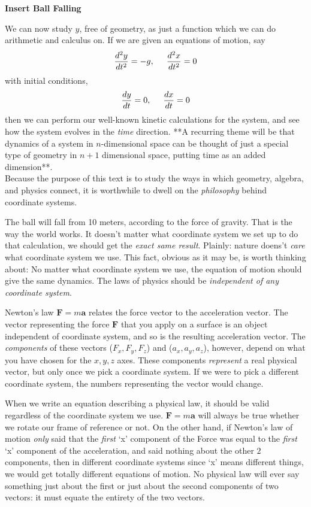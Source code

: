 	\textbf{Insert Ball Falling}
	
	We can now study $y$, free of geometry, as just a function which we can do arithmetic and calculus on. If we are given an equations of motion, say 
	\begin{equation*}
		\frac{d^2y}{dt^2} = -g, \hspace{5mm} \frac{d^2x}{dt^2} = 0
	\end{equation*} 
	with initial conditions,
	\begin{equation*}
		\frac{dy}{dt}=0, \hspace{5mm} \frac{dx}{dt}=0
	\end{equation*}
	 then we can perform our well-known kinetic calculations for the system, and see how the system evolves in the \emph{time} direction. **A recurring theme will be that dynamics of a system in $n$-dimensional space can be thought of just a special type of geometry in $n+1$ dimensional space, putting time as an added dimension**.\\
	
	Because the purpose of this text is to study the ways in which geometry, algebra, and physics connect, it is worthwhile to dwell on the \emph{philosophy} behind coordinate systems.
	
	The ball will fall from 10 meters, according to the force of gravity. That is the way the world works. It doesn't matter what coordinate system we set up to do that calculation, we should get the \emph{exact same result}. Plainly: nature doens't \emph{care} what coordinate system we use. This fact, obvious as it may be, is worth thinking about: No matter what coordinate system we use, the equation of motion should give the same dynamics. The laws of physics should be \emph{independent of any coordinate system}.
	
	Newton's law $\mathbf F = m \mathbf a$ relates the force vector to the acceleration vector. The vector representing the force $\mathbf F$ that you apply on a surface is an object independent of coordinate system, and so is the resulting acceleration vector. The \emph{components} of these vectors ($F_x, F_y, F_z$) and ($a_x, a_y, a_z$), however, depend on what you have chosen for the $x,y,z$ axes. These components \emph{represent} a real physical vector, but only once we pick a coordinate system. If we were to pick a different coordinate system, the numbers representing the vector would change. 
	
	When we write an equation describing a physical law, it should be valid regardless of the coordinate system we use. $\mathbf F = m \mathbf a$ will always be true whether we rotate our frame of reference or not. On the other hand, if Newton's law of motion \emph{only} said that the \emph{first} `x' component of the Force was equal to the \emph{first} `x' component of the acceleration, and said nothing about the other $2$ components, then in different coordinate systems since `x' means different things, we would get totally different equations of motion. No physical law will ever say something just about the first or just about the second components of two vectors: it must equate the entirety of the two vectors. 
	
